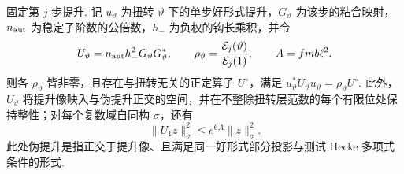 \begin{lemma}
\label{lem:c-comparison-operator}
\emitthmsource
固定第 $j$ 步提升. 记 $u_\vartheta$ 为扭转 $\vartheta$ 下的单步好形式提升，$G_\vartheta$ 为该步的粘合映射，$n_{\rm aut}$ 为稳定子阶数的公倍数，$h_-$ 为负权的钩长乘积，并令
\[
 U_\vartheta=n_{\rm aut}h_-^2G_\vartheta G_\vartheta^*,
 \qquad
 \rho_\vartheta=\frac{\mathcal E_j(\vartheta)}{\mathcal E_j(1)},
 \qquad A=fmb\ell^2 .
\]
则各 $\rho_\vartheta$ 皆非零，且存在与扭转无关的正定算子 $U^\circ$，满足 $u_\vartheta^*U_\vartheta u_\vartheta=\rho_\vartheta U^\circ$. 此外，$U_\vartheta$ 将提升像映入与伪提升正交的空间，并在不整除扭转层范数的每个有限位处保持整性；对每个复数域自同构 $\sigma$，还有
\[
 \|U_1 z\|_\sigma^2\le e^{6A}\|z\|_\sigma^2 .
\]
此处伪提升是指正交于提升像、且满足同一好形式部分投影与测试 Hecke 多项式条件的形式.
\end{lemma}
